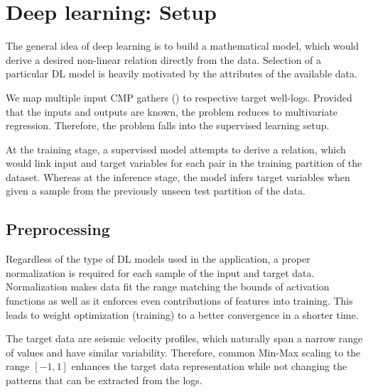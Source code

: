\documentclass[paper,twocolomn]{geophysics}
\begin{document}

\section{Deep learning: Setup}
The general idea of deep learning is to build a mathematical model, which would derive a desired non-linear relation directly from the data. Selection of a particular DL model is heavily motivated by the attributes of the available data. 

We map multiple input CMP gathers () to respective target well-logs. Provided that the inputs and outputs are known, the problem reduces to multivariate regression. Therefore, the problem falls into the supervised learning setup.  

At the training stage, a supervised model attempts to derive a relation, which would link input and target variables for each pair in the training partition of the dataset. Whereas at the inference stage, the model infers target variables when given a sample from the previously unseen test partition of the data.

\subsection{Preprocessing}
Regardless of the type of DL models used in the application, a proper normalization is required for each sample of the input and target data. Normalization makes data fit the range matching the bounds of activation functions as well as it enforces even contributions of features into training. This leads to weight optimization (training) to a better convergence in a shorter time.


The target data are seismic velocity profiles, which naturally span a narrow range of values and have similar variability. Therefore, common Min-Max scaling to the range $[-1, 1]$ enhances the target data representation while not changing the patterns that can be extracted from the logs.  
\end{document}
